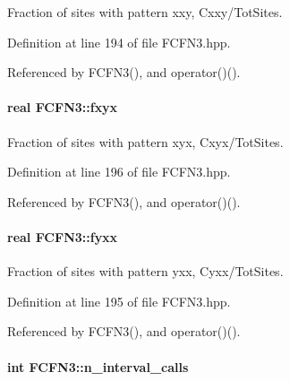\-Fraction of sites with pattern xxy, \-Cxxy/\-Tot\-Sites. 



\-Definition at line 194 of file \-F\-C\-F\-N3.\-hpp.



\-Referenced by \-F\-C\-F\-N3(), and operator()().

\hypertarget{classFCFN3_a59030dc1b324e8dd4f236b97d78d69cd}{
\paragraph[{fxyx}]{\setlength{\rightskip}{0pt plus 5cm}real {\bf \-F\-C\-F\-N3\-::fxyx}}}\label{classFCFN3_a59030dc1b324e8dd4f236b97d78d69cd}


\-Fraction of sites with pattern xyx, \-Cxyx/\-Tot\-Sites. 



\-Definition at line 196 of file \-F\-C\-F\-N3.\-hpp.



\-Referenced by \-F\-C\-F\-N3(), and operator()().

\hypertarget{classFCFN3_af6590c09108db59f2d7116837fb68917}{
\paragraph[{fyxx}]{\setlength{\rightskip}{0pt plus 5cm}real {\bf \-F\-C\-F\-N3\-::fyxx}}}\label{classFCFN3_af6590c09108db59f2d7116837fb68917}


\-Fraction of sites with pattern yxx, \-Cyxx/\-Tot\-Sites. 



\-Definition at line 195 of file \-F\-C\-F\-N3.\-hpp.



\-Referenced by \-F\-C\-F\-N3(), and operator()().

\hypertarget{classFCFN3_ac37ffd255223c75b83ea8805c9ca314d}{
\paragraph[{n\-\_\-interval\-\_\-calls}]{\setlength{\rightskip}{0pt plus 5cm}int {\bf \-F\-C\-F\-N3\-::n\-\_\-interval\-\_\-calls}}}\label{classFCFN3_ac37ffd255223c75b83ea8805c9ca314d}


